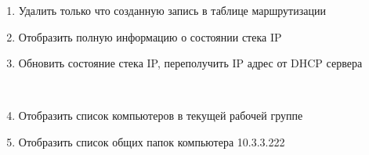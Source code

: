 \documentclass[a4paper,12pt]{article}
\begin{document}
\begin{flushleft}
\begin{enumerate} [1. ]
\begin{enumerate} [\bf a. ]
\begin{itemize}
           \item Маска - 
           \item Шлюз - определяется из предыдущего пункта
           \item Метрика - 25
           \item Интерфейс - 
          \end{itemize}
        \begin{flushleft}
        \end{flushleft}
        \item Удалить только что созданную запись в таблице маршрутизации
        \begin{flushleft}
        \end{flushleft}
        \item Отобразить полную информацию о состоянии стека IP
        \begin{flushleft}
        \end{flushleft}
        \item Обновить состояние стека IP, переполучить IP адрес от DHCP сервера
        \begin{flushleft}
          \\
          
        \end{flushleft}
        \item Отобразить список компьютеров в текущей рабочей группе
        \begin{flushleft}
        \end{flushleft}
        \item Отобразить список общих папок компьютера 10.3.3.222
        \begin{flushleft}
          \\[1.5cm]
        \end{flushleft}

        \end{enumerate}
    \end{enumerate}

  \end{flushleft}
\end{document}
